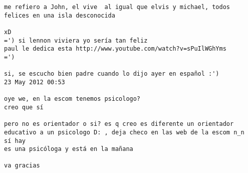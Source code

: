 \begin{verbatim}
me refiero a John, el vive  al igual que elvis y michael, todos felices en una isla desconocida

xD
=') si lennon viviera yo sería tan feliz
paul le dedica esta http://www.youtube.com/watch?v=sPuIlWGhYms
=')

si, se escucho bien padre cuando lo dijo ayer en español :')
23 May 2012 00:53

oye we, en la escom tenemos psicologo?
creo que sí

pero no es orientador o si? es q creo es diferente un orientador educativo a un psicologo D: , deja checo en las web de la escom n_n
sí hay
es una psicóloga y está en la mañana

va gracias
\end{verbatim}
